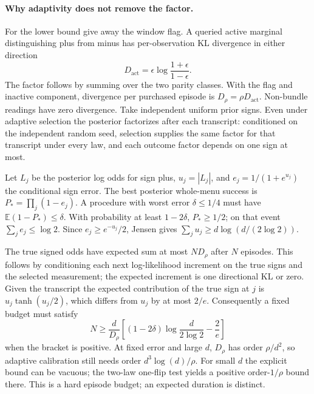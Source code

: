\documentclass{article}
\begin{document}
\paragraph{Why adaptivity does not remove the factor.}
For the lower bound give away the window flag. A queried active
marginal distinguishing plus from minus has per-observation
KL divergence in either direction
\[
 D_{\mathrm{act}}=\epsilon \log\frac{1+\epsilon}{1-\epsilon}.
\]
The factor follows by summing over the two parity classes.
With the flag and inactive component, divergence per purchased
episode is \(D_\rho=\rho D_{\mathrm{act}}\). Non-bundle readings
have zero divergence. Take independent uniform prior signs.
Even under adaptive selection the posterior factorizes after
each transcript: conditioned on the independent random seed,
selection supplies the same factor for that transcript under
every law, and each outcome factor depends on one sign at most.

Let \(L_j\) be the posterior log odds for sign plus, \(u_j=|L_j|\),
and \(e_j=1/(1+e^{u_j})\) the conditional sign error. The best
posterior whole-menu success is \(P_*=\prod_j(1-e_j)\).
A procedure with worst error \(\delta\le 1/4\) must have
\(\mathbb E(1-P_*)\le\delta\). With probability at least
\(1-2\delta\), \(P_*\ge1/2\); on that event
\(\sum_j e_j\le\log 2\). Since
\(e_j\ge e^{-u_j}/2\), Jensen gives
\(\sum_j u_j\ge d\log(d/(2\log 2))\).

The true signed odds have expected sum at most \(N D_\rho\)
after \(N\) episodes. This follows by conditioning each next
log-likelihood increment on the true signs and the selected
measurement; the expected increment is one directional KL or
zero. Given the transcript the expected contribution of the true
sign at \(j\) is \(u_j\tanh(u_j/2)\), which differs from \(u_j\)
by at most \(2/e\). Consequently a fixed budget must satisfy
\[
 N\ge \frac{d}{D_\rho}
 \left[(1-2\delta)\log\frac{d}{2\log2}-\frac{2}{e}\right]
\]
when the bracket is positive. At fixed error and large \(d\),
\(D_\rho\) has order \(\rho/d^2\), so adaptive calibration still
needs order \(d^3\log(d)/\rho\).
For small \(d\) the explicit bound can be vacuous; the two-law
one-flip test yields a positive order-\(1/\rho\) bound there.
This is a hard episode budget; an expected duration is distinct.
\end{document}
